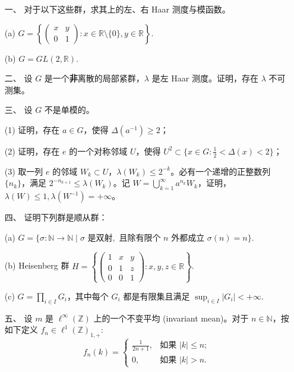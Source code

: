 \begin{enumerate}
    \item[一、]对于以下这些群，求其上的左、右 Haar 测度与模函数。
    \item[(a)] $ G = \left\{ \begin{pmatrix} x & y \\ 0 & 1 \end{pmatrix} : x \in \mathbb{R} \setminus \{0\}, y \in \mathbb{R} \right\} $.
    \item[(b)] $ G = GL(2, \mathbb{R}) $.

    \item[二、]设 $ G $ 是一个\textbf{非}离散的局部紧群，$ \lambda $ 是左 Haar 测度。证明，存在 $ \lambda $ 不可测集。

    \item[三、]设 $ G $ 不是单模的。
    \item[(1)] 证明，存在 $ a \in G $，使得 $ \Delta (a^{-1}) \geq 2 $；
    \item[(2)] 证明，存在 $ e $ 的一个对称邻域 $ U $，使得 $ U^2 \subset \{x \in G : \frac{1}{2} < \Delta (x) < 2\} $；
    \item[(3)] 取一列 $ e $ 的邻域 $ W_k \subset U $，$ \lambda (W_k) \leq 2^{-k} $。必有一个递增的正整数列 $\{n_k\}$，满足 $ 2^{-n_{k+1}} \leq \lambda (W_k) $。记 $ W = \bigcup_{k=1}^{\infty} a^{n_k} W_k $，证明，$ \lambda (W) \leq 1, \lambda (W^{-1}) = +\infty $。

    \item[四、]
    证明下列群是顺从群：
    \item[(a)] $ G = \{\sigma : \mathbb{N} \to \mathbb{N} \mid \sigma \text{ 是双射}, \text{ 且除有限个 } n \text{ 外都成立 } \sigma (n) = n\} $.
    \item[(b)] Heisenberg 群 $ H = \left\{ \begin{pmatrix} 1 & x & y \\ 0 & 1 & z \\ 0 & 0 & 1 \end{pmatrix} : x, y, z \in \mathbb{R} \right\} $.
    \item[(c)] $ G = \prod_{i \in I} G_i $，其中每个 $ G_i $ 都是有限集且满足 $\sup_{i \in I} |G_i| < +\infty$.

    \item[五、]设 $ m $ 是 $ \ell^{\infty}(\mathbb{Z}) $ 上的一个不变平均 (invariant mean)。对于 $ n \in \mathbb{N} $，按如下定义 $ f_n \in \ell^1(\mathbb{Z})_{1,+} $:
        \[
        f_n(k) = 
        \begin{cases} 
        \frac{1}{2n+1}, & \text{如果 } |k| \leq n; \\
        0, & \text{如果 } |k| > n.
        \end{cases}
        \]


\end{enumerate}
